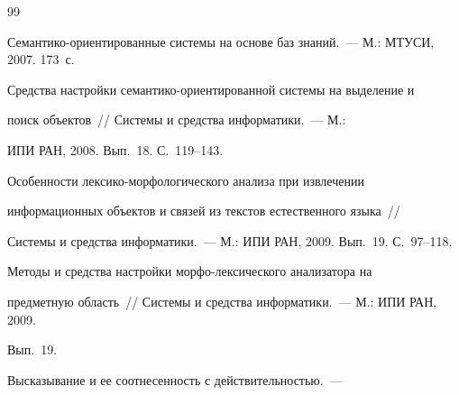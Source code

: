 {\small\frenchspacing


{%




\begin{thebibliography}{99}









Семантико-ориентированные системы на основе баз знаний.~--- М.: МТУСИ, 2007. 173~с.












Средства настройки семантико-ориентированной системы на выделение и 


поиск объектов~/\!\!/ Системы и средства информатики.~--- М.: 


ИПИ РАН, 2008.  Вып.~18. С.~119--143.









Особенности лексико-морфологического анализа при извлечении 


информационных объектов и связей из текстов естественного языка~/\!\!/


Системы и средства информатики.~--- М.: ИПИ РАН, 2009.   Вып.~19. С.~97--118.









Методы и средства настройки морфо-лексического анализатора на 


предметную область~/\!\!/ Системы и средства информатики.~--- М.: ИПИ РАН, 2009.  


Вып.~19. 









Высказывание и ее соотнесенность с действительностью.~--- 



\end{thebibliography}}}
